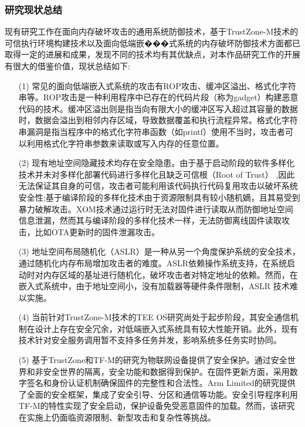 \documentclass[12pt,a4paper]{ctexart}
\numberwithin{figure}{section}
\begin{document}
\subsubsection{研究现状总结}
\par 现有研究工作在面向内存破坏攻击的通用系统防御技术，基于TrustZone-M技术的可信执行环境构建技术以及面向低端嵌���式系统的内存破坏防御技术方面都已取得一定的进展和成果，发现不同的技术均有其优缺点，对本作品研究工作的开展有很大的借鉴价值，现状总结如下:
\begin{itemize}
    \item[(1)]常见的面向低端嵌入式系统的攻击有ROP攻击、缓冲区溢出、格式化字符串等。ROP攻击是一种利用程序中已存在的代码片段（称为gadget）构建恶意代码的技术。缓冲区溢出则是指当向有限大小的缓冲区写入超过其容量的数据时，数据会溢出到相邻内存区域，导致数据覆盖和执行流程异常。格式化字符串漏洞是指当程序中的格式化字符串函数（如printf）使用不当时，攻击者可以利用格式化字符串参数来读取或写入内存的任意位置。
    \item[(2)] 现有地址空间隐藏技术均存在安全隐患。由于基于启动阶段的软件多样化技术并未对多样化部署代码进行多样化且缺乏可信根（Root of Trust） ,因此无法保证其自身的可信，攻击者可能利用该代码执行代码复用攻击以破坏系统安全性;基于编译阶段的多样化技术由于资源限制具有较小随机嫡，且其易受到暴力破解攻击。XOM技术通过运行时无法对固件进行读取从而防御地址空间信息泄漏，然而其与编译阶段的多样化技术一样，无法防御离线固件读取攻击，比如OTA更新时的固件泄漏攻击。
    \item[(3)] 地址空间布局随机化（ASLR）是一种从另一个角度保护系统的安全技术，通过随机化内存布局增加攻击者的难度。ASLR依赖操作系统支持，在系统启动时对内存区域的基址进行随机化，破坏攻击者对特定地址的依赖。然而，在嵌入式系统中，由于地址空间小，没有加载器等硬件条件限制，ASLR 技术难以实施。
    \item[(4)] 当前针对TrustZone-M技术的TEE OS研究尚处于起步阶段，其安全通信机制在设计上存在安全冗余，对低端嵌入式系统具有较大性能开销。此外，现有技术针对安全服务调用暂不支持多任务并发，影响系统多任务实时协同。
    \item[(5)] 基于TrustZone和TF-M的研究为物联网设备提供了安全保护。通过安全世界和非安全世界的隔离，安全功能和数据得到保护。在固件更新方面，采用数字签名和身份认证机制确保固件的完整性和合法性。Arm Limited的研究提供了全面的安全框架，集成了安全引导、分区和通信等功能。安全引导程序利用TF-M的特性实现了安全启动，保护设备免受恶意固件的加载。然而，该研究在实施上仍面临资源限制、新型攻击和复杂性等挑战。
\end{itemize}
\end{document}

